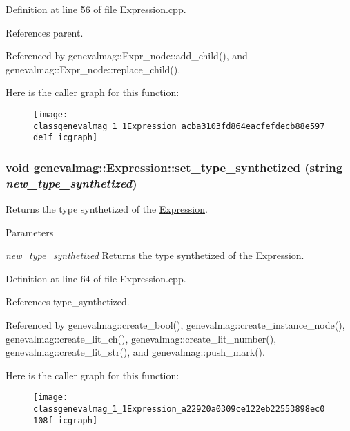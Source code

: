 Definition at line 56 of file Expression.cpp.



References parent.



Referenced by genevalmag::Expr\_\-node::add\_\-child(), and genevalmag::Expr\_\-node::replace\_\-child().



Here is the caller graph for this function:\nopagebreak
\begin{figure}[H]
\begin{center}
\leavevmode
\texttt{[image: classgenevalmag\_1\_1Expression\_acba3103fd864eacfefdecb88e597de1f\_icgraph]}
\end{center}
\end{figure}


\hypertarget{classgenevalmag_1_1Expression_a22920a0309ce122eb22553898ec0108f}{
\subsubsection[{set\_\-type\_\-synthetized}]{\setlength{\rightskip}{0pt plus 5cm}void genevalmag::Expression::set\_\-type\_\-synthetized (string {\em new\_\-type\_\-synthetized})}}
\label{classgenevalmag_1_1Expression_a22920a0309ce122eb22553898ec0108f}
Returns the type synthetized of the \hyperlink{classgenevalmag_1_1Expression}{Expression}. 
\begin{DoxyParams}{Parameters}
\item[{\em new\_\-type\_\-synthetized}]Returns the type synthetized of the \hyperlink{classgenevalmag_1_1Expression}{Expression}. \end{DoxyParams}


Definition at line 64 of file Expression.cpp.



References type\_\-synthetized.



Referenced by genevalmag::create\_\-bool(), genevalmag::create\_\-instance\_\-node(), genevalmag::create\_\-lit\_\-ch(), genevalmag::create\_\-lit\_\-number(), genevalmag::create\_\-lit\_\-str(), and genevalmag::push\_\-mark().



Here is the caller graph for this function:\nopagebreak
\begin{figure}[H]
\begin{center}
\leavevmode
\texttt{[image: classgenevalmag\_1\_1Expression\_a22920a0309ce122eb22553898ec0108f\_icgraph]}
\end{center}
\end{figure}


